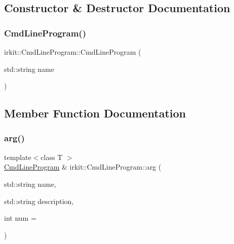 \subsection{Constructor \& Destructor Documentation}
\mbox{\label{classirkit_1_1CmdLineProgram_a76344c8801faf43d19cdc29d865ec471}} 
\subsubsection{\texorpdfstring{Cmd\+Line\+Program()}{CmdLineProgram()}}
{\footnotesize\ttfamily irkit\+::\+Cmd\+Line\+Program\+::\+Cmd\+Line\+Program (\begin{DoxyParamCaption}\item[{std\+::string}]{name }\end{DoxyParamCaption})\hspace{0.3cm}{\ttfamily [inline]}}



\subsection{Member Function Documentation}
\mbox{\label{classirkit_1_1CmdLineProgram_a581bb25b7618eac6e57d94f752391ba1}} 
\subsubsection{\texorpdfstring{arg()}{arg()}}
{\footnotesize\ttfamily template$<$class T $>$ \\
\mbox{\hyperlink{classirkit_1_1CmdLineProgram}{Cmd\+Line\+Program}} \& irkit\+::\+Cmd\+Line\+Program\+::arg (\begin{DoxyParamCaption}\item[{std\+::string}]{name,  }\item[{std\+::string}]{description,  }\item[{int}]{num = {} }\end{DoxyParamCaption})\hspace{0.3cm}{\ttfamily [inline]}}

